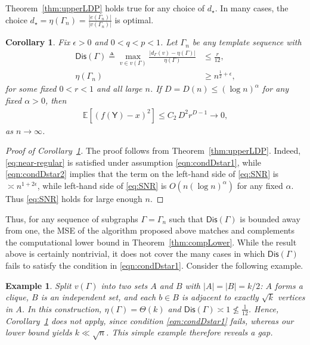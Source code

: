 \documentclass[12pt]{article}
\newcommand{\bE}{\mathbb{E}}
\newtheorem{example}{Example}
\newtheorem{corollary}{Corollary}
\newcommand{\pp}[1]{\left[#1\right]}
\newcommand{\s}[1]{\mathsf{#1}}
\begin{document}
Theorem~\ref{thm:upperLDP} holds true for any choice of $d_{\star}$. In many cases, the choice $d_\star = \eta(\Gamma_n) = \frac{|e(\Gamma_n)|}{|v(\Gamma_n)|}$ is optimal. 
\begin{corollary}\label{cor:half-plus-eps}
Fix $\epsilon>0$ and $0<q<p<1$. Let $\Gamma_n$ be any template sequence with
\begin{align}
\s{Dis}(\Gamma)\triangleq\max_{v\in v(\Gamma)} \frac{|d_\Gamma(v)-\eta(\Gamma)|}{\eta(\Gamma)}&\leq\frac{r}{12},\label{eqn:condDstar1}\\
\eta(\Gamma_n)&\geq n^{\frac12+\epsilon},\label{eqn:condDstar2}
\end{align}
for some fixed $0<r<1$ and all large $n$. If $D=D(n)\leq (\log n)^{\alpha}$ for any fixed $\alpha>0$, then %
\begin{align}
\bE\pp{(f(\s{Y})-x)^2}\leq C_2\,D^2r^{D-1}\to0,
\end{align}
as $n\to\infty$.
\end{corollary}
\begin{proof}[Proof of Corollary~\ref{cor:half-plus-eps}]
The proof follows from Theorem~\ref{thm:upperLDP}. Indeed, \eqref{eq:near-regular} is satisfied under assumption \eqref{eqn:condDstar1}, while \eqref{eqn:condDstar2} implies that the term on the left-hand side of \eqref{eq:SNR} is $\asymp n^{1+2\epsilon}$, while left-hand side of \eqref{eq:SNR} is $O(n(\log n)^{\alpha})$ for any fixed $\alpha$. Thus \eqref{eq:SNR} holds for large enough $n$.
\end{proof}
Thus, for any sequence of subgraphs $\Gamma = \Gamma_n$ such that $\s{Dis}(\Gamma)$ is bounded away from one, the MSE of the algorithm proposed above matches and complements the computational lower bound in Theorem~\ref{thm:compLower}. While the result above is certainly nontrivial, it does not cover the many cases in which $\s{Dis}(\Gamma)$ fails to satisfy the condition in \eqref{eqn:condDstar1}. Consider the following example.
\begin{example}
Split $v(\Gamma)$ into two sets $A$ and $B$ with $|A| = |B| = k/2$: $A$ forms a clique, $B$ is an independent set, and each $b \in B$ is adjacent to exactly $\sqrt{k}$ vertices in $A$. In this construction, $\eta(\Gamma) = \Theta(k)$ and $\s{Dis}(\Gamma) \asymp 1 \not\leq \tfrac{1}{12}$. Hence, Corollary~\ref{cor:half-plus-eps} does not apply, since condition \eqref{eqn:condDstar1} fails, whereas our lower bound yields $k \ll \sqrt{n}$. This simple example therefore reveals a gap.
\end{example}
\end{document}
